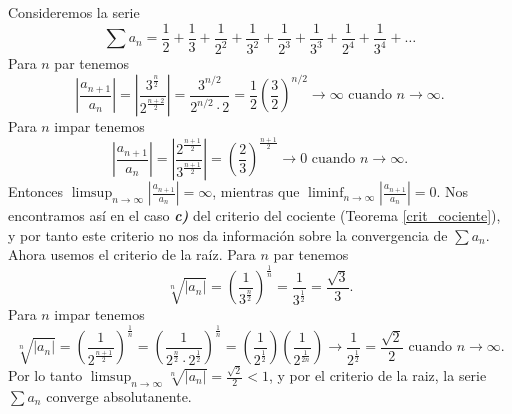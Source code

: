 \begin{example}
  Consideremos la serie 
  $$\sum a_n=\frac{1}{2}+\frac{1}{3}+\frac{1}{2^2}+\frac{1}{3^2}+\frac{1}{2^3}+\frac{1}{3^3}+\frac{1}{2^4}+\frac{1}{3^4}+\dots$$
  Para $n$ par tenemos 
  $$\left|\frac{a_{n+1}}{a_n}\right|=\left|\frac{3^{\frac{n}{2}}}{2^{\frac{n+2}{2}}}\right|=\frac{3^{n / 2}}{2^{n / 2}\cdot 2} =\frac{1}{2}\left(\frac{3}{2}\right)^{n / 2} \rightarrow \infty \text{ cuando } n \rightarrow \infty.$$
  Para $n$ impar tenemos 
  $$\left|\frac{a_{n+1}}{a_n}\right|=\left|\frac{2^{\frac{n+1}{2}}}{3^{\frac{n+1}{2}}}\right|=\left(\frac{2}{3}\right)^{\frac{n+1}{2}} \rightarrow 0 \text{ cuando } n \rightarrow \infty.$$
  Entonces $\limsup_ {n \rightarrow \infty}\left|\frac{a_{n+1}}{a_n}\right|=\infty$, mientras que $\liminf_ {n \rightarrow \infty}\left|\frac{a_{n+1}}{a_n}\right|=0$. Nos encontramos así en el caso \textit{\textbf{c)}} del criterio del cociente (Teorema \ref{crit_cociente}), y por tanto este criterio no nos da información sobre la convergencia de $\sum a_n$.\\
  Ahora usemos el criterio de la raíz. Para $n$ par tenemos
  $$\sqrt[n]{\left|a_n\right|}=\left(\frac{1}{3^{\frac{n}{2}}}\right)^\frac{1}{n}=\frac{1}{3^\frac{1}{2}}=\frac{\sqrt{3}}{3}.$$
  Para $n$ impar tenemos
  $$\sqrt[n]{\left|a_n\right|}=\left(\frac{1}{2^\frac{n+1}{2}}\right)^\frac{1}{n}=\left(\frac{1}{2^\frac{n}{2}\cdot 2^\frac{1}{2}}\right)^\frac{1}{n}=\left(\frac{1}{2^\frac{1}{2}}\right)\left(\frac{1}{2^\frac{1}{2n}}\right)\to \frac{1}{2^\frac{1}{2}}=\frac{\sqrt{2}}{2} \text{ cuando }n\to\infty.$$
  Por lo tanto $\limsup _{n \rightarrow \infty} \sqrt[n]{\left|a_n\right|}=\frac{\sqrt{2}}{2}<1$, y por el criterio de la raiz, la serie $\sum a_n$ converge absolutanente.
\end{example}
